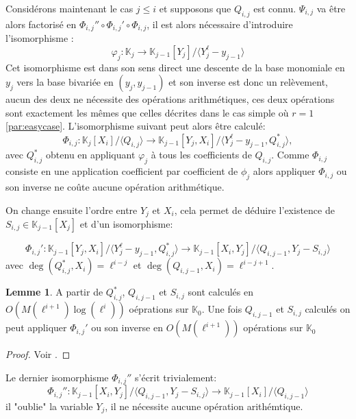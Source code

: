 \documentclass[10pt,a4paper]{book}
\theoremstyle{plain}
\theoremstyle{definition}
\newtheorem{lem}[thm]{Lemme}
\theoremstyle{definition}
\theoremstyle{definition}
\theoremstyle{definition}
\theoremstyle{remark}
\theoremstyle{remark}
\begin{document}
Considérons maintenant le cas $j \leqslant i$ et supposons que $Q_{i,j}$ est connu. $\Psi_{i,j}$ va être alors factorisé en $\Phi_{i,j}'' \circ \Phi_{i,j}' \circ \Phi_{i,j}$, il est alors nécessaire d'introduire l'isomorphisme :
\begin{equation*}
\varphi_j:\mathbb{K}_j \to \mathbb{K}_{j-1}[Y_j]/\langle Y_j^{\ell}-y_{j-1} \rangle
\end{equation*}
Cet isomorphisme est dans son sens direct une descente de la base monomiale en $y_j$ vers la base bivariée en $(y_j,y_{j-1})$ et son inverse est donc un relèvement, aucun des deux ne nécessite des opérations arithmétiques, ces deux opérations sont exactement les mêmes que celles décrites dans le cas simple où $r=1$ \ref{par:easycase}. L'isomorphisme suivant peut alors être calculé:
\begin{equation*}
\Phi_{i,j}: \mathbb{K}_j[X_i]/\langle Q_{i,j} \rangle \to \mathbb{K}_{j-1}[Y_j,X_i]/\langle Y_j^{\ell}-y_{j-1},Q_{i,j}^* \rangle , 
\end{equation*} 
avec $Q_{i,j}^*$ obtenu en appliquant $\varphi_j$ à tous les coefficients de $Q_{i,j}$. Comme $\Phi_{i,j}$ consiste en une application coefficient par coefficient de $\phi_j$ alors appliquer $\Phi_{i,j}$ ou son inverse ne coûte aucune opération arithmétique.

On change ensuite l'ordre entre $Y_j$ et $X_i$, cela permet de déduire l'existence de $S_{i,j} \in \mathbb{K}_{j-1}[X_j]$ et d'un isomorphisme:

\begin{equation*}
\Phi_{i,j}': \mathbb{K}_{j-1}[Y_j,X_i]/ \langle Y_j^{\ell}-y_{j-1},Q_{i,j}^* \rangle \to \mathbb{K}_{j-1}[X_i,Y_j]/\langle Q_{i,j-1}, Y_j-S_{i,j}\rangle
\end{equation*}
avec $\deg(Q_{i,j}^*,X_i)=\ell^{i-j}$ et $\deg(Q_{i,j-1},X_i)=\ell^{i-j+1}$.

\begin{lem}
A partir de $Q_{i,j}^*$, $Q_{i,j-1}$ et $S_{i,j}$ sont calculés en $O(M(\ell^{i+1})\log(\ell^i))$ oéprations sur $\mathbb{K}_0$. Une fois  $Q_{i,j-1}$ et $S_{i,j}$ calculés on peut appliquer $\Phi_{i,j}'$ ou son inverse en $O(M(\ell^{i+1}))$ opérations sur $\mathbb{K}_0$
\end{lem}

\begin{proof}
Voir \cite{DeFeo-Doliskani-Schost13}.
\end{proof}

Le dernier isomorphisme $\Phi_{i,j}''$ s'écrit trivialement:
\begin{equation*}
\Phi_{i,j}'': \mathbb{K}_{j-1}[X_i,Y_j]/\langle Q_{i,j-1}, Y_j-S_{i,j}\rangle \to \mathbb{K}_{j-1}[X_i]/\langle Q_{i,j-1} \rangle 
\end{equation*}
il "oublie" la variable $Y_j$, il ne nécessite aucune opération arithémtique.
\end{document}
